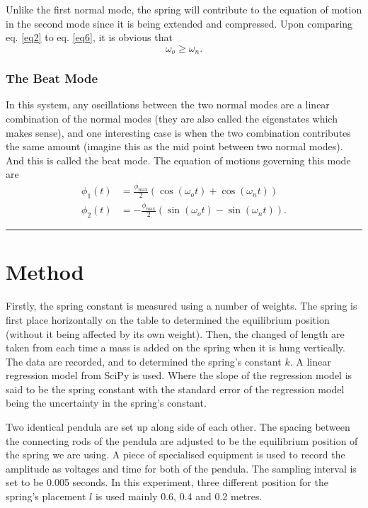 \documentclass[aps,prl,reprint,10pt,amsmath,amssymb,superscriptaddress,a4paper]{revtex4-2}
\begin{document}
Unlike the first normal mode, the spring will contribute to the equation of motion in the second mode since it is being extended and compressed. Upon comparing eq. \ref{eq2} to eq. \ref{eq6}, it is obvious that 
$$\omega_o \ge \omega_n.$$

\subsubsection{The Beat Mode}
In this system, any oscillations between the two normal modes are a linear combination of the normal modes (they are also called the eigenstates which makes sense), and one interesting case is when the two combination contributes the same amount (imagine this as the mid point between two normal modes). And this is called the beat mode. The equation of motions governing this mode are 
\begin{align}
    \phi_1(t) &= \frac{\phi_{\text{max}}}{2} (\cos(\omega_o t) + \cos(\omega_n t))\\
    \phi_2(t) &= -\frac{\phi_{\text{max}}}{2} (\sin(\omega_o t) - \sin(\omega_n t)).
\end{align}
\par\noindent\rule{\linewidth}{0.4pt}

\section{Method}
Firstly, the spring constant is measured using a number of weights. The spring is first place horizontally on the table to determined the equilibrium position (without it being affected by its own weight). Then, the changed of length are taken from each time a mass is added on the spring when it is hung vertically. The data are recorded, and to determined the spring's constant $k$. A linear regression model from SciPy\cite{2020SciPy-NMeth} is used. Where the slope of the regression model is said to be the spring constant with the standard error of the regression model being the uncertainty in the spring's constant.

Two identical pendula are set up along side of each other. The spacing between the connecting rods of the pendula are adjusted to be the equilibrium position of the spring we are using. A piece of specialised equipment is used to record the amplitude as voltages and time for both of the pendula. The sampling interval is set to be 0.005 seconds. In this experiment, three different position for the spring's placement $l$ is used mainly 0.6, 0.4 and 0.2 metres. 
\end{document}
